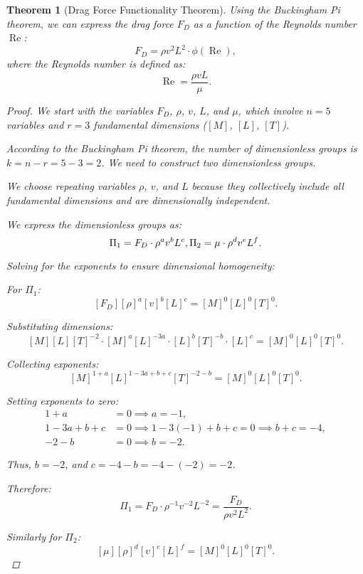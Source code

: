 \documentclass{article}
\newtheorem{theorem}{Theorem}[section]
\theoremstyle{definition}
\theoremstyle{remark}
\begin{document}
	\begin{theorem}[Drag Force Functionality Theorem]
		Using the Buckingham Pi theorem, we can express the drag force $F_D$ as a function of the Reynolds number $\operatorname{Re}$:
		\[
		F_D = \rho v^2 L^2 \cdot \phi(\operatorname{Re}),
		\]
		where the Reynolds number is defined as:
		\[
		\operatorname{Re} = \dfrac{\rho v L}{\mu}.
		\]
		
		\begin{proof}
			We start with the variables $F_D$, $\rho$, $v$, $L$, and $\mu$, which involve $n = 5$ variables and $r = 3$ fundamental dimensions ($[M]$, $[L]$, $[T]$).
			
			According to the Buckingham Pi theorem, the number of dimensionless groups is $k = n - r = 5 - 3 = 2$. We need to construct two dimensionless groups.
			
			We choose repeating variables $\rho$, $v$, and $L$ because they collectively include all fundamental dimensions and are dimensionally independent.
			
			We express the dimensionless groups as:
			\[
			\Pi_1 = F_D \cdot \rho^a v^b L^c, \\
			\Pi_2 = \mu \cdot \rho^d v^e L^f.
			\]
			
			Solving for the exponents to ensure dimensional homogeneity:
			
			For $\Pi_1$:
			\[
			[F_D][\rho]^a [v]^b [L]^c = [M]^0 [L]^0 [T]^0.
			\]
			
			Substituting dimensions:
			\[
			[M][L][T]^{-2} \cdot [M]^{a}[L]^{-3a} \cdot [L]^{b}[T]^{-b} \cdot [L]^c = [M]^0 [L]^0 [T]^0.
			\]
			
			Collecting exponents:
			\[
			[M]^{1 + a} [L]^{1 - 3a + b + c} [T]^{-2 - b} = [M]^0 [L]^0 [T]^0.
			\]
			
			Setting exponents to zero:
			\begin{align*}
				1 + a &= 0 \implies a = -1, \\
				1 - 3a + b + c &= 0 \implies 1 - 3(-1) + b + c = 0 \implies b + c = -4, \\
				-2 - b &= 0 \implies b = -2.
			\end{align*}
			
			Thus, $b = -2$, and $c = -4 - b = -4 - (-2) = -2$.
			
			Therefore:
			\[
			\Pi_1 = F_D \cdot \rho^{-1} v^{-2} L^{-2} = \dfrac{F_D}{\rho v^2 L^2}.
			\]
			
			Similarly for $\Pi_2$:
			\[
			[\mu][\rho]^d [v]^e [L]^f = [M]^0 [L]^0 [T]^0.
			\]
			

\end{proof}
\end{theorem}
\end{document}
